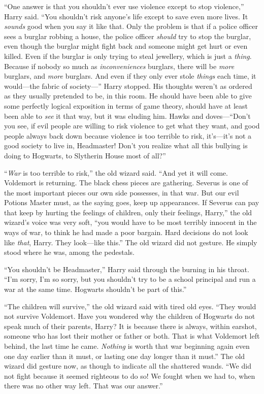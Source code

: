 “One answer is that you shouldn’t ever use violence except to stop violence,” Harry said. “You shouldn’t risk anyone’s life except to save even more lives. It \emph{sounds} good when you say it like that. Only the problem is that if a police officer sees a burglar robbing a house, the police officer \emph{should} try to stop the burglar, even though the burglar might fight back and someone might get hurt or even killed. Even if the burglar is only trying to steal jewellery, which is just a \emph{thing}. Because if nobody so much as \emph{inconveniences} burglars, there will be \emph{more} burglars, and \emph{more} burglars. And even if they only ever stole \emph{things} each time, it would—the fabric of society—” Harry stopped. His thoughts weren’t as ordered as they usually pretended to be, in this room. He should have been able to give some perfectly logical exposition in terms of game theory, should have at least been able to \emph{see} it that way, but it was eluding him. Hawks and doves—“Don’t you see, if evil people are willing to risk violence to get what they want, and good people always back down because violence is too terrible to risk, it’s—it’s not a good society to live in, Headmaster! Don’t you realize what all this bullying is doing to Hogwarts, to Slytherin House most of all?”

“\emph{War} is too terrible to risk,” the old wizard said. “And yet it will come. Voldemort is returning. The black chess pieces are gathering. Severus is one of the most important pieces our own side possesses, in that war. But our evil Potions Master must, as the saying goes, keep up appearances. If Severus can pay that keep by hurting the feelings of children, only their feelings, Harry,” the old wizard’s voice was very soft, “you would have to be most terribly innocent in the ways of war, to think he had made a poor bargain. Hard decisions do not look like \emph{that}, Harry. They look—like this.” The old wizard did not gesture. He simply stood where he was, among the pedestals.

“You shouldn’t be Headmaster,” Harry said through the burning in his throat. “I’m sorry, I’m so sorry, but you shouldn’t try to be a school principal and run a war at the same time. Hogwarts shouldn’t be part of this.”

“The children will survive,” the old wizard said with tired old eyes. “They would not survive Voldemort. Have you wondered why the children of Hogwarts do not speak much of their parents, Harry? It is because there is always, within earshot, someone who has lost their mother or father or both. That is what Voldemort left behind, the last time he came. \emph{Nothing} is worth that war beginning again even one day earlier than it must, or lasting one day longer than it must.” The old wizard did gesture now, as though to indicate all the shattered wands. “We did not fight because it seemed righteous to do so! We fought when we had to, when there was no other way left. That was our answer.”

